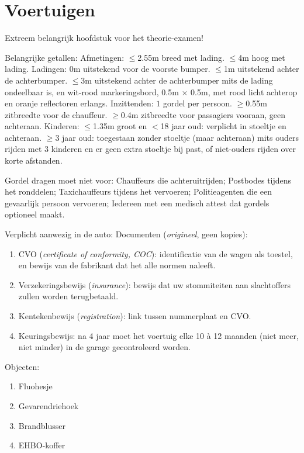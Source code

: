 \section{Voertuigen}
Extreem belangrijk hoofdstuk voor het theorie-examen!
\begin{outline}
\1 Belangrijke getallen:
	\2 Afmetingen:
		\3 $\leq$2.55m breed met lading.
		\3 $\leq$4m hoog met lading.
	\2 Ladingen:
		\3 $0$m uitstekend voor de voorste bumper.
		\3 $\leq$1m uitstekend achter de achterbumper.
		\3 $\leq$3m uitstekend achter de achterbumper mits
			\4 de lading ondeelbaar is, en
			\4 wit-rood markeringsbord, 0.5m $\times$ 0.5m, met rood licht achterop en oranje reflectoren erlangs.
	\2 Inzittenden:
		\3 $1$ gordel per persoon.
		\3 $\geq$0.55m zitbreedte voor de chauffeur.
		\3 $\geq$0.4m zitbreedte voor passagiers vooraan, geen achteraan.
	\2 Kinderen:
		\3 $\leq$1.35m groot en $<$18 jaar oud: verplicht in stoeltje en achteraan.
		\3 $\geq$3 jaar oud: toegestaan zonder stoeltje (maar achteraan) mits
			\4 ouders rijden met 3 kinderen en er geen extra stoeltje bij past, of
			\4 niet-ouders rijden over korte afstanden.

\1 Gordel dragen moet niet voor:
	\2 Chauffeurs die achteruitrijden;
	\2 Postbodes tijdens het ronddelen;
	\2 Taxichauffeurs tijdens het vervoeren;
	\2 Politieagenten die een gevaarlijk persoon vervoeren;
	\2 Iedereen met een medisch attest dat gordels optioneel maakt.

\1 Verplicht aanwezig in de auto:
	\2 Documenten (\emph{origineel}, geen kopies):
	\begin{enumerate}
		\item CVO (\emph{certificate of conformity, COC}): identificatie van de wagen als toestel, en bewijs van de fabrikant dat het alle normen naleeft.
		\item Verzekeringsbewijs (\emph{insurance}): bewijs dat uw stommiteiten aan slachtoffers zullen worden terugbetaald.
		\item Kentekenbewijs (\emph{registration}): link tussen nummerplaat en CVO.
		\item Keuringsbewijs: na 4 jaar moet het voertuig elke 10 à 12 maanden (niet meer, niet minder) in de garage gecontroleerd worden.
	\end{enumerate}
	
	\newpage

	\2 Objecten:
	\begin{enumerate}
		\item Fluohesje
		\item Gevarendriehoek
		\item Brandblusser
		\item EHBO-koffer
	\end{enumerate}


\end{outline}
